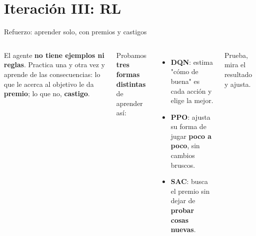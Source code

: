 \documentclass[aspectratio=169,10pt]{beamer}
\newcommand{\hl}[1]{\textcolor{UDCmag}{\textbf{#1}}}
\begin{document}
\section{Iteración III: RL}
\begin{frame}{Refuerzo: aprender solo, con premios y castigos}
  \begin{columns}[T]
      El agente \hl{no tiene ejemplos ni reglas}. Practica una y otra vez y aprende de las
      consecuencias: lo que le acerca al objetivo le da \hl{premio}; lo que no, \hl{castigo}.

      \vspace{0.6em}
      Probamos \hl{tres formas distintas} de aprender así:
      \begin{itemize}\itemsep4pt\footnotesize
        \item \hl{DQN}: estima "cómo de buena" es cada acción y elige la mejor.
        \item \hl{PPO}: ajusta su forma de jugar \hl{poco a poco}, sin cambios bruscos.
        \item \hl{SAC}: busca el premio sin dejar de \hl{probar cosas nuevas}.
      \end{itemize}
      \centering

      \vspace{0.2em}
      {\scriptsize Prueba, mira el resultado y ajusta.}
  \end{columns}
\end{frame}
\end{document}
